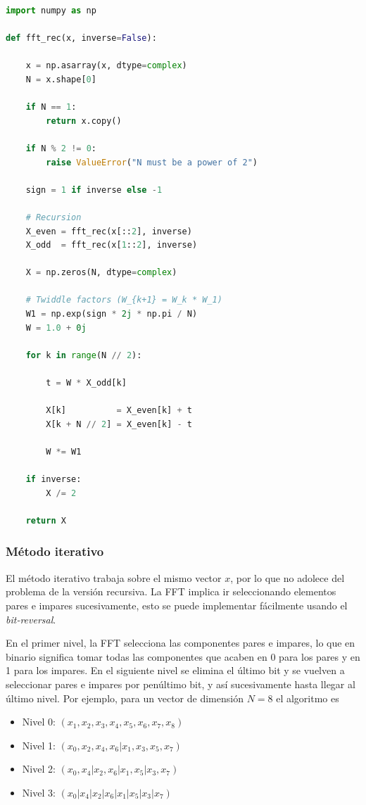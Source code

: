 \documentclass[11pt,a4paper,twoside,pdf]{article}
\numberwithin{equation}{section}
\begin{document}
\begin{lstlisting}[language=Python, caption = Función que implementa la FFT con el método recursivo.]
import numpy as np

def fft_rec(x, inverse=False):

    x = np.asarray(x, dtype=complex)
    N = x.shape[0]

    if N == 1:
        return x.copy()

    if N % 2 != 0:
        raise ValueError("N must be a power of 2")

    sign = 1 if inverse else -1

    # Recursion
    X_even = fft_rec(x[::2], inverse)
    X_odd  = fft_rec(x[1::2], inverse)

    X = np.zeros(N, dtype=complex)

    # Twiddle factors (W_{k+1} = W_k * W_1)
    W1 = np.exp(sign * 2j * np.pi / N)
    W = 1.0 + 0j

    for k in range(N // 2):

        t = W * X_odd[k]

        X[k]          = X_even[k] + t
        X[k + N // 2] = X_even[k] - t

        W *= W1

    if inverse:
        X /= 2

    return X
\end{lstlisting}




\subsubsection{Método iterativo}


El método iterativo trabaja sobre el mismo vector $x$, por lo que no adolece del problema de la versión recursiva. La FFT implica ir seleccionando elementos pares e impares sucesivamente, esto se puede implementar fácilmente usando el \textit{bit-reversal}.

En el primer nivel, la FFT selecciona las componentes pares e impares, lo que en binario significa tomar todas las componentes que acaben en 0 para los pares y en 1 para los impares. En el siguiente nivel se elimina el último bit y se vuelven a seleccionar pares e impares por penúltimo bit, y así sucesivamente hasta llegar al último nivel. Por ejemplo, para un vector de dimensión $N = 8$ el algoritmo es

\begin{itemize}
    \item Nivel 0: \qquad $(x_1, x_2, x_3,x_4,x_5,x_6,x_7,x_8)$
    \item Nivel 1: \qquad $(x_0,x_2,x_4,x_6 | x_1,x_3,x_5,x_7)$
    \item Nivel 2: \qquad $(x_0,x_4 | x_2,x_6 | x_1,x_5 | x_3,x_7)$
    \item Nivel 3: \qquad $(x_0 | x_4 | x_2 | x_6 | x_1 |x_5 | x_3 | x_7)$
\end{itemize}
\end{document}
